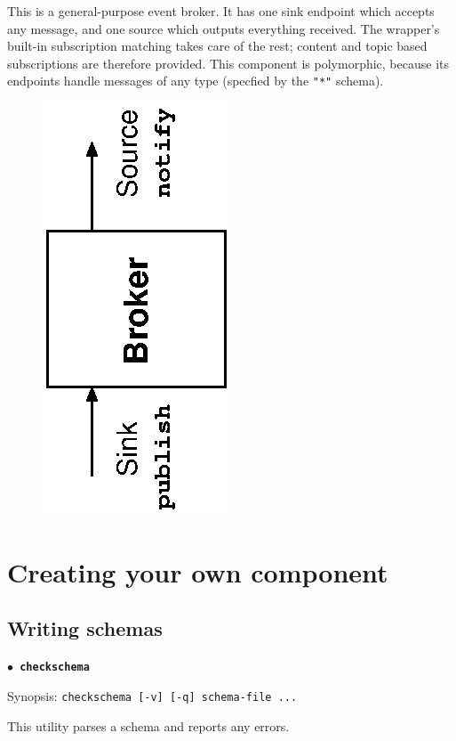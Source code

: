 \documentclass[12pt,a4paper,twoside]{article}
\renewcommand{\_}{\texttt{\symbol{95}}}
\begin{document}
This is a general-purpose event broker.
It has one sink endpoint which
accepts any message, and one source which outputs everything
received. The wrapper's built-in subscription matching takes care of
the rest; content and topic based subscriptions are therefore provided.
This component is polymorphic, because its endpoints handle
messages of any type (specfied by the \verb^"*"^ schema).

\begin{figure}[ht]
\centering
\includegraphics[scale=1.0,angle=-90]{diagrams/broker.eps}
\end{figure}

\section{Creating your own component}

\subsection{Writing schemas}

\textbf{\texttt{\large $\bullet$ checkschema}}

Synopsis:
\verb^checkschema [-v] [-q] schema-file ...^

This utility parses a schema and reports any errors.
\end{document}
